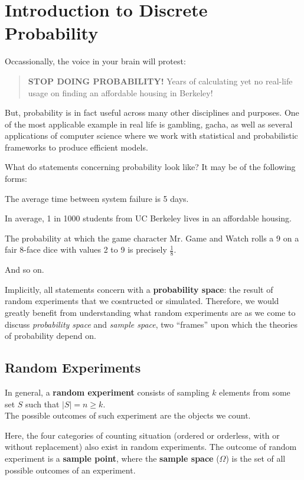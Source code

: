 \chapter{Introduction to Discrete Probability}

Occassionally, the voice in your brain will protest:
\begin{quote}
    \textbf{STOP DOING PROBABILITY!} Years of calculating yet no real-life usage on finding an affordable housing in Berkeley!
\end{quote}
But, probability is in fact useful across many other disciplines and purposes. One of the most applicable example in real life is gambling, gacha, as well as several applications of computer science where we work with statistical and probabilistic frameworks to produce efficient models.

What do statements concerning probability look like? It may be of the following forms:
\begin{bindenum}
    \item The average time between system failure is 5 days.
    \item In average, 1 in 1000 students from UC Berkeley lives in an affordable housing.
    \item The probability at which the game character Mr. Game and Watch rolls a 9 on a fair 8-face dice with values 2 to 9 is precisely $\frac{1}{8}$.
\end{bindenum}
And so on.

Implicitly, all statements concern with a \textbf{probability space}: the result of random experiments that we cosntructed or simulated. Therefore, we would greatly benefit from understanding what random experiments are as we come to discuss \textit{probability space} and \textit{sample space}, two ``frames'' upon which the theories of probability depend on.

\section{Random Experiments}
In general, a \textbf{random experiment} consists of sampling $k$ elements from some set $S$ such that $|S| = n \geq k$. \\
The possible outcomes of such experiment are the objects we count.

Here, the four categories of counting situation (ordered or orderless, with or without replacement) also exist in random experiments. The outcome of random experiment is a \textbf{sample point}, where the \textbf{sample space} ($\Omega$) is the set of all possible outcomes of an experiment.

